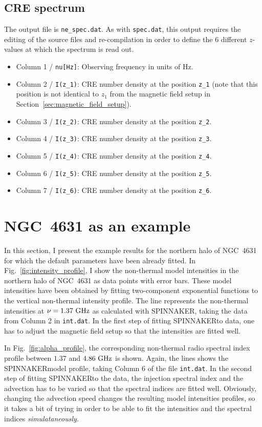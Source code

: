 \documentclass[11pt,twocolumn,a4paper]{article}
\newcommand\spix{{\small SPINNAKER}}
\begin{document}
\subsection{CRE spectrum}
The output file is {\tt ne\_spec.dat}. As with {\tt spec.dat}, this output requires the editing of the source files and re-compilation in order to define the 6 different $z$-values at which the spectrum is read out.
\begin{itemize}
\item Column 1 / {\tt nu[Hz]}: Observing frequency in units of Hz.
\item Column 2 / {\tt I(z\_1)}: CRE number density at the position {\tt z\_1}  (note that this position is not identical to $z_1$ from the magnetic field setup in Section~\ref{sec:magnetic_field_setup}).
\item Column 3 / {\tt I(z\_2)}: CRE number density at the position {\tt z\_2}.
\item Column 4 / {\tt I(z\_3)}: CRE number density at the position {\tt z\_3}.
\item Column 5 / {\tt I(z\_4)}: CRE number density at the position {\tt z\_4}.
\item Column 6 / {\tt I(z\_5)}: CRE number density at the position {\tt z\_5}.
\item Column 7 / {\tt I(z\_6)}: CRE number density at the position {\tt z\_6}.
\end{itemize}

\section{NGC~4631 as an example}
In this section, I present the example results for the northern halo of NGC~4631 for which the default parameters have been already fitted. In Fig.~\ref{fig:intensity_profile}, I show the non-thermal model intensities in the northern halo of NGC~4631 as data points with error bars. These model intensities have been obtained by fitting two-component exponential functions to the vertical non-thermal intensity profile. The line represents the non-thermal intensities at $\nu=1.37~\rm GHz$ as calculated with \spix, taking the data from Column 2 in {\tt int.dat}. In the first step of fitting \spix to data, one has to adjust the magnetic field setup so that the intensities are fitted well.

In Fig.~\ref{fig:alpha_profile}, the corresponding non-thermal radio spectral index profile between $1.37$ and $4.86~\rm GHz$ is shown. Again, the lines shows the \spix model profile, taking Column 6 of the file {\tt int.dat}. In the second step of fitting \spix to the data, the injection spectral index and the advection has to be varied so that the spectral indices are fitted well. Obviously, changing the advection speed changes the resulting model intensities profiles, so it takes a bit of trying in order to be able to fit the intensities and the spectral indices \emph{simulataneously}.
\end{document}
